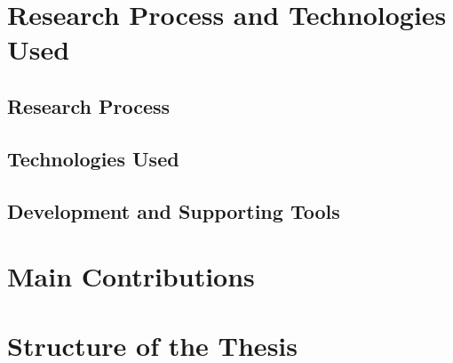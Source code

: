 \section{Research Process and Technologies Used}
\subsection{Research Process}
\subsection{Technologies Used}
\subsection{Development and Supporting Tools}

\section{Main Contributions}

\section{Structure of the Thesis}
